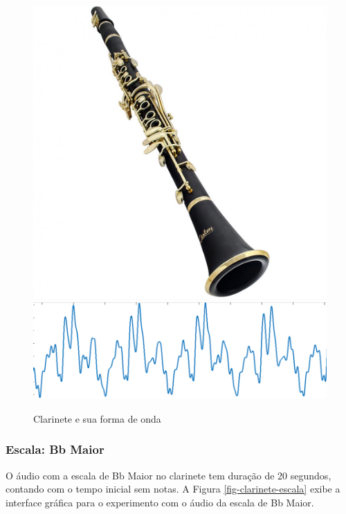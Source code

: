 \begin{figure}[h!]
	\centering
	\includegraphics[width=\linewidth/4]{pasta1_figuras/clarinete.jpg}
	\includegraphics[scale=0.45]{pasta1_figuras/clarinete-timbre.png}
	\caption{Clarinete e sua forma de onda}
	\label{fig-clarinete}
\end{figure}

\subsubsection{Escala: Bb Maior}

O áudio com a escala de Bb Maior no clarinete tem duração de 20 segundos, contando com o tempo inicial sem notas. A Figura \ref{fig-clarinete-escala} exibe a interface gráfica para o experimento com o áudio da escala de Bb Maior.

